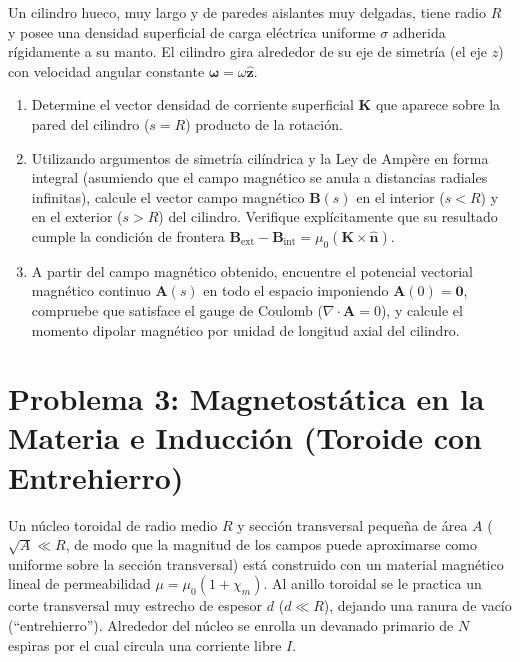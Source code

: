 \documentclass[11pt]{article}
\begin{document}
Un cilindro hueco, muy largo y de paredes aislantes muy delgadas, tiene radio $R$ y posee una densidad superficial de carga eléctrica uniforme $\sigma$ adherida rígidamente a su manto. El cilindro gira alrededor de su eje de simetría (el eje $z$) con velocidad angular constante $\boldsymbol{\omega} = \omega \hat{\mathbf{z}}$.

\begin{enumerate}
    \item[a)] Determine el vector densidad de corriente superficial $\mathbf{K}$ que aparece sobre la pared del cilindro ($s = R$) producto de la rotación.
    \item[b)] Utilizando argumentos de simetría cilíndrica y la Ley de Ampère en forma integral (asumiendo que el campo magnético se anula a distancias radiales infinitas), calcule el vector campo magnético $\mathbf{B}(s)$ en el interior ($s < R$) y en el exterior ($s > R$) del cilindro. Verifique explícitamente que su resultado cumple la condición de frontera $\mathbf{B}_{\text{ext}} - \mathbf{B}_{\text{int}} = \mu_0 (\mathbf{K} \times \hat{\mathbf{n}})$.
    \item[c)] A partir del campo magnético obtenido, encuentre el potencial vectorial magnético continuo $\mathbf{A}(s)$ en todo el espacio imponiendo $\mathbf{A}(0) = \mathbf{0}$, compruebe que satisface el gauge de Coulomb ($\nabla \cdot \mathbf{A} = 0$), y calcule el momento dipolar magnético por unidad de longitud axial del cilindro.
\end{enumerate}

\vspace{0.3cm}

\section*{Problema 3: Magnetostática en la Materia e Inducción (Toroide con Entrehierro)}

Un núcleo toroidal de radio medio $R$ y sección transversal pequeña de área $A$ ($\sqrt{A} \ll R$, de modo que la magnitud de los campos puede aproximarse como uniforme sobre la sección transversal) está construido con un material magnético lineal de permeabilidad $\mu = \mu_0(1 + \chi_m)$. Al anillo toroidal se le practica un corte transversal muy estrecho de espesor $d$ ($d \ll R$), dejando una ranura de vacío (``entrehierro''). Alrededor del núcleo se enrolla un devanado primario de $N$ espiras por el cual circula una corriente libre $I$.
\end{document}
